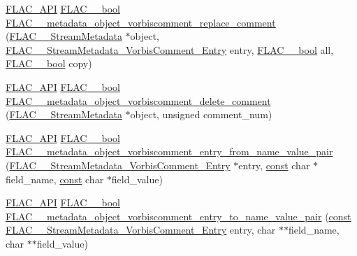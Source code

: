 \begin{DoxyCompactItemize}
\item 
\hyperlink{group__flac__export_ga56ca07df8a23310707732b1c0007d6f5}{F\+L\+A\+C\+\_\+\+A\+PI} \hyperlink{ordinals_8h_a95103469f1cbd78b8cf250194985b34e}{F\+L\+A\+C\+\_\+\+\_\+bool} \hyperlink{group__flac__metadata__object_gabef3625575b7e4c7257617a27220959a}{F\+L\+A\+C\+\_\+\+\_\+metadata\+\_\+object\+\_\+vorbiscomment\+\_\+replace\+\_\+comment} (\hyperlink{struct_f_l_a_c_____stream_metadata}{F\+L\+A\+C\+\_\+\+\_\+\+Stream\+Metadata} $\ast$object, \hyperlink{struct_f_l_a_c_____stream_metadata___vorbis_comment___entry}{F\+L\+A\+C\+\_\+\+\_\+\+Stream\+Metadata\+\_\+\+Vorbis\+Comment\+\_\+\+Entry} entry, \hyperlink{ordinals_8h_a95103469f1cbd78b8cf250194985b34e}{F\+L\+A\+C\+\_\+\+\_\+bool} all, \hyperlink{ordinals_8h_a95103469f1cbd78b8cf250194985b34e}{F\+L\+A\+C\+\_\+\+\_\+bool} copy)
\item 
\hyperlink{group__flac__export_ga56ca07df8a23310707732b1c0007d6f5}{F\+L\+A\+C\+\_\+\+A\+PI} \hyperlink{ordinals_8h_a95103469f1cbd78b8cf250194985b34e}{F\+L\+A\+C\+\_\+\+\_\+bool} \hyperlink{group__flac__metadata__object_ga2d1b309d4ca207039ad6d19bd779800f}{F\+L\+A\+C\+\_\+\+\_\+metadata\+\_\+object\+\_\+vorbiscomment\+\_\+delete\+\_\+comment} (\hyperlink{struct_f_l_a_c_____stream_metadata}{F\+L\+A\+C\+\_\+\+\_\+\+Stream\+Metadata} $\ast$object, unsigned comment\+\_\+num)
\item 
\hyperlink{group__flac__export_ga56ca07df8a23310707732b1c0007d6f5}{F\+L\+A\+C\+\_\+\+A\+PI} \hyperlink{ordinals_8h_a95103469f1cbd78b8cf250194985b34e}{F\+L\+A\+C\+\_\+\+\_\+bool} \hyperlink{group__flac__metadata__object_ga0ec0c7ddd3a8832ee7a75bf47956b1c7}{F\+L\+A\+C\+\_\+\+\_\+metadata\+\_\+object\+\_\+vorbiscomment\+\_\+entry\+\_\+from\+\_\+name\+\_\+value\+\_\+pair} (\hyperlink{struct_f_l_a_c_____stream_metadata___vorbis_comment___entry}{F\+L\+A\+C\+\_\+\+\_\+\+Stream\+Metadata\+\_\+\+Vorbis\+Comment\+\_\+\+Entry} $\ast$entry, \hyperlink{getopt1_8c_a2c212835823e3c54a8ab6d95c652660e}{const} char $\ast$field\+\_\+name, \hyperlink{getopt1_8c_a2c212835823e3c54a8ab6d95c652660e}{const} char $\ast$field\+\_\+value)
\item 
\hyperlink{group__flac__export_ga56ca07df8a23310707732b1c0007d6f5}{F\+L\+A\+C\+\_\+\+A\+PI} \hyperlink{ordinals_8h_a95103469f1cbd78b8cf250194985b34e}{F\+L\+A\+C\+\_\+\+\_\+bool} \hyperlink{group__flac__metadata__object_gaca557b35c7c1ac19e30794bcf529746b}{F\+L\+A\+C\+\_\+\+\_\+metadata\+\_\+object\+\_\+vorbiscomment\+\_\+entry\+\_\+to\+\_\+name\+\_\+value\+\_\+pair} (\hyperlink{getopt1_8c_a2c212835823e3c54a8ab6d95c652660e}{const} \hyperlink{struct_f_l_a_c_____stream_metadata___vorbis_comment___entry}{F\+L\+A\+C\+\_\+\+\_\+\+Stream\+Metadata\+\_\+\+Vorbis\+Comment\+\_\+\+Entry} entry, char $\ast$$\ast$field\+\_\+name, char $\ast$$\ast$field\+\_\+value)

\end{DoxyCompactItemize}

